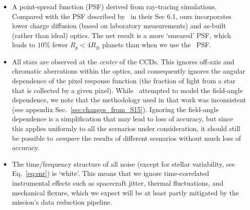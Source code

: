 \begin{itemize}
\begin{itemize}
	  \item A point-spread function (PSF) derived from ray-tracing
            simulations.
            Compared with the PSF described by~ in 
            their Sec 6.1, ours incorporates lower charge diffusion (based on 
            laboratory measurements) and as-built (rather than ideal) optics.
            The net result is a more `smeared' PSF, which leads to $10\%$ fewer 
            $R_p<4R_\oplus$ planets than when we use 
            the~ PSF.
            \begin{comment} %
            I used a charge diffusion model that added 42 um RMS charge 
            diffusion for electrons traveling the 100 um silicon thickness. 
            Using new data on charge diffusion measurements, and taking the 
            temperature dependence of charge diffusion in silicon into account, 
            the new simulations add 2.6 um RMS charge diffusion for electrons 
            traveling the 100 um silicon thickness Therefore, the new PSFs are 
            better (lower charge diffusion) and worse (as-built vs. ideal 
            optics) than the earlier modeling.
            \end{comment}
          \item All stars are observed at the \textit{center} of the
            \tess CCDs. This ignores off-axis and chromatic
            aberrations within the \tess optics, and consequently
            ignores the angular dependence of the pixel response
            function (the fraction of light from a star that is
            collected by a given pixel).
            While~ attempted to model the
            field-angle dependence, we note that the methodology used
            in that work was inconsistent (see appendix
            Sec.~\ref{sec:changes_from_S15}).  
            Ignoring the field-angle dependence is a simplification that may 
            lead to loss of accuracy, but since this applies uniformly to all 
            the scenarios under consideration, it should still be possible
            to {\it compare} the results of different scenarios
            without much loss of accuracy.
            
         \item The time/frequency structure of all noise (except for
           stellar variability, see Eq.~\ref{eq:snr}) is `white'.  
           This means that we ignore time-correlated instrumental effects 
           such as spacecraft jitter, thermal fluctuations, and mechanical
           flexure, which we expect will be at least partly mitigated
           by the mission's data reduction pipeline.
                  

\end{itemize}
\end{itemize}
